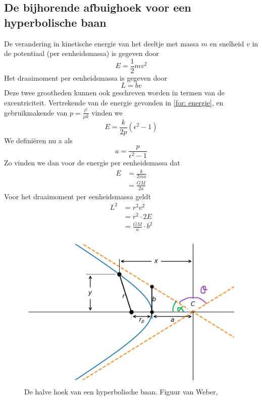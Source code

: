 \subsection{De bijhorende afbuighoek voor een hyperbolische baan}
De verandering in kinetische energie van het deeltje met massa $m$ en snelheid $v$ in de potentiaal (per eenheidsmassa) is gegeven door 
\begin{equation}
    E=\frac{1}{2}mv^{2}
    \label{for:energie}
\end{equation}
Het draaimoment per eenheidsmassa is gegeven door
\begin{equation}
    L=bv
    \label{for:draaimoment}
\end{equation}
Deze twee grootheden kunnen ook geschreven worden in termen van de excentriciteit. Vertrekende van de energie gevonden in \cref{for: energie}, en gebruikmakende van $p=\frac{l^{2}}{\mu k}$ vinden we
$$E=\frac{k}{2p}(\epsilon^{2}-1)$$
We definiëren nu a als
$$a=\frac{p}{\epsilon^{2}-1}$$
Zo vinden we dan voor de energie per eenheidsmassa dat
\begin{align}
    E &= \frac{k}{2ma}\nonumber \\
    &= \frac{GM}{2a}
    \label{for:E}
\end{align}
Voor het draaimoment per eenheidsmassa geldt
\begin{align}
    L^{2} &= r^{2}v^{2}\nonumber \\
    &= r^{2}\cdot 2E \nonumber \\
    &= \frac{GM}{a}\cdot b^{2}
    \label{for:L2}
\end{align}
\begin{figure}
    \centering
    \includegraphics[width=0.95\linewidth]{Figures/hoek_hyperbool.png}
    \caption{De halve hoek van een hyperbolische baan. Figuur van Weber, \cite{weber-no-date}}
    \label{fig: halve hoek}
\end{figure}
